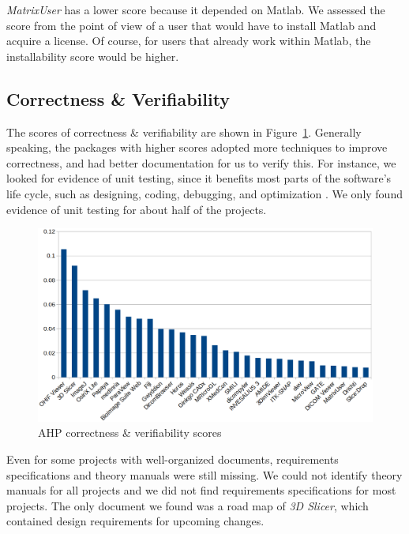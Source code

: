 \documentclass[final, 3p, times, authoryear]{elsarticle}
\begin{document}
\textit{MatrixUser} has a lower score because it depended on Matlab. We assessed
the score from the point of view of a user that would have to install Matlab and
acquire a license.  Of course, for users that already work within Matlab, the
installability score would be higher.

\subsection{Correctness \& Verifiability} \label{sec_result_correctness_verifiability}

The scores of correctness \& verifiability are shown in
Figure~\ref{fg_correctness_verifiability_scores}. Generally speaking, the
packages with higher scores adopted more techniques to improve correctness, and
had better documentation for us to verify this.  For instance, we looked for
evidence of unit testing, since it benefits most parts of the software's life
cycle, such as designing, coding, debugging, and optimization
\citep{Hamill2004}.  We only found evidence of unit testing for about half of
the projects.

\begin{figure}[ht]
\includegraphics[scale=0.38]{figures/correctness_verifiability_scores.png}
\caption{AHP correctness \& verifiability scores}
\label{fg_correctness_verifiability_scores}
\end{figure}

Even for some projects with well-organized documents, requirements
specifications and theory manuals were still missing.  We could not identify
theory manuals for all projects and we did not find requirements specifications
for most projects. The only document we found was a road map of \textit{3D
Slicer}, which contained design requirements for upcoming changes.
\end{document}
